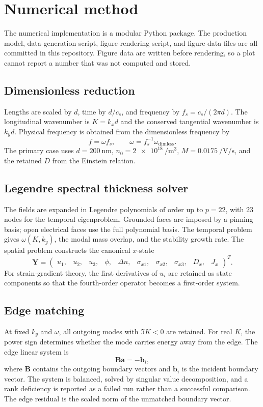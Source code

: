 \section{Numerical method}\label{sec:numerical}

The numerical implementation is a modular Python package. The production model,
data-generation script, figure-rendering script, and figure-data files are all
committed in this repository. Figure data are written before rendering, so a plot
cannot report a number that was not computed and stored.

\subsection{Dimensionless reduction}
Lengths are scaled by \(d\), time by \(d/c_s\), and frequency by
\(f_s=c_s/(2\pi d)\). The longitudinal wavenumber is \(K=k_xd\) and the
conserved tangential wavenumber is \(k_yd\). Physical frequency is obtained from
the dimensionless frequency by
\[
f=\omega f_s,
\qquad
\omega=f_s^{-1}\omega_{\mathrm{dimless}}.
\]
The primary case uses \(d=\SI{200}{\nano\metre}\), \(n_0=\SI{2e18}{\per\cubic\metre}\),
\(M=\SI{0.0175}{\per\volt\per\second}\), and the retained \(D\) from the Einstein
relation.

\subsection{Legendre spectral thickness solver}
The fields are expanded in Legendre polynomials of order up to \(p=22\), with
\(23\) nodes for the temporal eigenproblem. Grounded faces are imposed by a
pinning basis; open electrical faces use the full polynomial basis. The temporal
problem gives \(\omega(K,k_y)\), the modal mass overlap, and the stability growth
rate. The spatial problem constructs the canonical \(x\)-state
\[
\mathbf Y=\begin{pmatrix}
u_1,&u_2,&u_3,&\phi,&\Delta n,&
\sigma_{x1},&\sigma_{x2},&\sigma_{x3},&
D_x,&J_x
\end{pmatrix}^{T}.
\]
For strain-gradient theory, the first derivatives of \(u_i\) are retained as
state components so that the fourth-order operator becomes a first-order system.

\subsection{Edge matching}
At fixed \(k_y\) and \(\omega\), all outgoing modes with
\(\Im K<0\) are retained. For real \(K\), the power sign determines whether the
mode carries energy away from the edge. The edge linear system is
\[
\mathbf B\mathbf a=-\mathbf b_i,
\]
where \(\mathbf B\) contains the outgoing boundary vectors and \(\mathbf b_i\) is
the incident boundary vector. The system is balanced, solved by singular value
decomposition, and a rank deficiency is reported as a failed run rather than a
successful comparison. The edge residual is the scaled norm of the unmatched
boundary vector.

